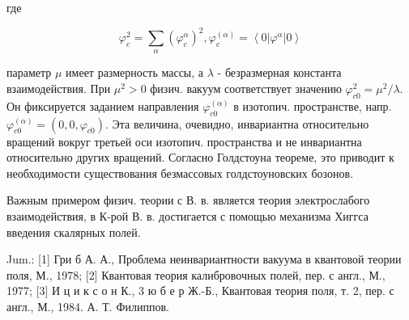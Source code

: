 \documentclass[10pt]{article}
\begin{document}
где



\[

\varphi_{c}^{2}=\sum_{\alpha}\left(\varphi_{c}^{\alpha}\right)^{2}, \varphi_{c}^{(\alpha)}=\left\langle 0\left|\varphi^{\alpha}\right| 0\right\rangle

\]



параметр $\mu$ имеет размерность массы, а $\lambda$ - безразмерная константа взаимодействия. При $\mu^{2}>0$ физич. вакуум соответствует значению $\varphi_{c 0}^{2}=\mu^{2} / \lambda$. Он фиксируется заданием направления $\varphi_{c 0}^{(\alpha)}$ в изотопич. пространстве, напр. $\varphi_{c 0}^{(\alpha)}=\left(0,0, \varphi_{c 0}\right)$. Эта величина, очевидно, инвариантна относительно вращений вокруг третьей оси изотопич. пространства и не инвариантна относительно других вращений. Согласно Голдстоуна теореме, это приводит к необходимости существования безмассовых голдстоуновских бозонов.



Важным примером физич. теории с В. в. является теория электрослабого взаимодействия, в К-рой В. в. достигается с помощью механизма Хиггса введения скалярных полей.



Jum.: [1] Гри б А. А., Проблема неинвариантности вакуума в квантовой теории поля, М., 1978; [2] Квантовая теория калибровочных полей, пер. с англ., М., 1977; [3] И ц и к с о н К., 3 ю б е р Ж.-Б., Квантовая теория поля, т. 2, пер. с англ., М., 1984. А. Т. Филиппов.
\end{document}
